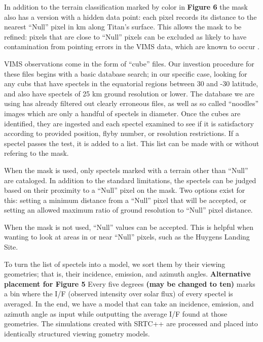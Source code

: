 \documentclass[twocolumn,linenumbers]{aastex631}
\begin{document}
In addition to the terrain classification marked by color in \textbf{\color{blue}Figure 6\color{black}} the mask also has a version with a hidden data point: each pixel records its distance to the nearest ``Null'' pixel in km along Titan's surface. This allows the mask to be refined: pixels that are close to ``Null'' pixels can be excluded as likely to have contamination from pointing errors in the VIMS data, which are known to occur \citep{Barnes2008}. 

VIMS observations come in the form of ``cube'' files. Our investion procedure for these files begins with a basic database search; in our specific case, looking for any cubs that have spectels in the equatorial regions between 30 and -30 latitude, and also have spectels of 25 km ground resolution or lower. The database we are using has already filtered out clearly erroneous files, as well as so called ``noodles'' images which are only a handful of spectels in diameter. Once the cubes are identified, they are ingested and each spectel examined to see if it is satisfactory according to provided position, flyby number, or resolution restrictions. If a spectel passes the test, it is added to a list. This list can be made with or without refering to the mask. 

When the mask is used, only spectels marked with a terrain other than ``Null'' are cataloged. In addition to the standard limitations, the spectels can be judged based on their proximity to a ``Null'' pixel on the mask. Two options exist for this: setting a minimum distance from a ``Null'' pixel that will be accepted, or setting an allowed maximum ratio of ground resolution to ``Null'' pixel distance.

When the mask is not used, ``Null'' values can be accepted. This is helpful when wanting to look at areas in or near ``Null'' pixels, such as the Huygens Landing Site. 

To turn the list of spectels into a model, we sort them by their viewing geometries; that is, their incidence, emission, and azimuth angles.  \textbf{\color{red}Alternative placement for Figure 5\color{black}} Every five degrees \textbf{\color{red}(may be changed to ten)\color{black}} marks a bin where the I/F (observed intensity over solar flux) of every spectel is averaged. In the end, we have a model that can take an incidence, emission, and azimuth angle as input while outputting the average I/F found at those geometries. The simulations created with SRTC++ are processed and placed into identically structured viewing gometry models.
\end{document}
